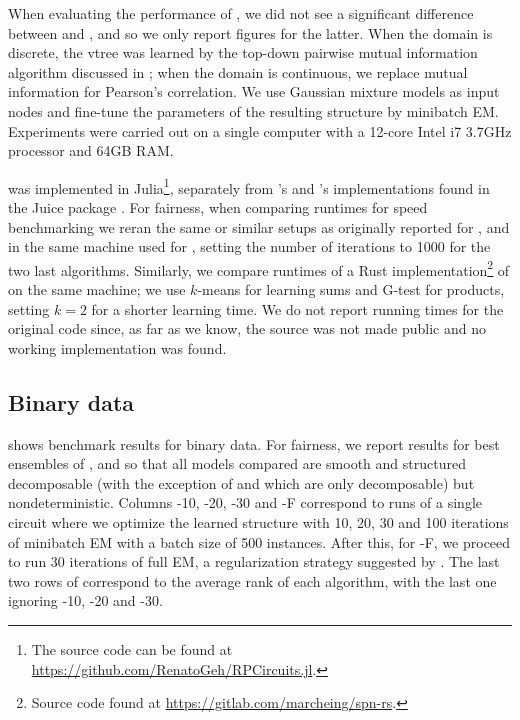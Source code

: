 When evaluating the performance of , we did not see a significant difference
between  and , and so we only report figures for the latter.
When the domain is discrete, the vtree was learned by the top-down pairwise mutual information
algorithm discussed in ; when the domain is continuous, we replace mutual
information for Pearson's correlation. We use Gaussian mixture models as input nodes and fine-tune
the parameters of the resulting structure by minibatch EM. Experiments were carried out on a
single computer with a 12-core Intel i7 3.7GHz processor and 64GB RAM.

 was implemented in Julia\footnote{The source code can be found at
\url{https://github.com/RenatoGeh/RPCircuits.jl}.}, separately from 's and
's implementations found in the Juice package \citep{dang21}. For fairness,
when comparing runtimes for speed benchmarking we reran the same or similar setups as originally
reported for ,  and  in the same machine used
for , setting the number of iterations to 1000 for the two last \incrclass{}
algorithms. Similarly, we compare runtimes of a Rust implementation\footnote{Source code found at
\url{https://gitlab.com/marcheing/spn-rs}.} of  on the same machine; we use
$k$-means for learning sums and G-test for products, setting $k=2$ for a shorter learning time. We
do not report running times for the original  code since, as far as we know,
the source was not made public and no working implementation was found.

\subsection{Binary data}

 shows benchmark results for binary data. For fairness, we report results for best
ensembles of ,  and  so that all models
compared are smooth and structured decomposable (with the exception of  and
 which are only decomposable) but nondeterministic. Columns
-10, -20, -30 and -F
correspond to runs of a single  circuit where we optimize the learned structure
with 10, 20, 30 and 100 iterations of minibatch EM with a batch size of 500 instances. After this,
for -F, we proceed to run 30 iterations of full EM, a regularization strategy
suggested by \citet{liu21}. The last two rows of  correspond to the average rank
of each algorithm, with the last one ignoring -10, -20 and
-30.

